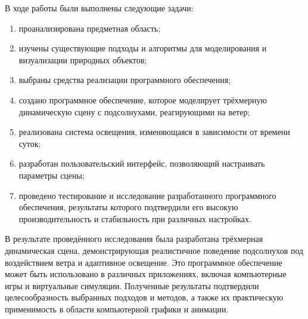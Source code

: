
\vspace{0.5cm}
В ходе работы были выполнены следующие задачи:
\begin{enumerate}
\item проанализирована предметная область;
\item изучены существующие подходы и алгоритмы для моделирования и визуализации природных объектов;
\item выбраны средства реализации программного обеспечения;
\item создано программное обеспечение, которое моделирует трёхмерную динамическую сцену с подсолнухами, реагирующими на ветер;
\item реализована система освещения, изменяющаяся в зависимости от времени суток;
\item разработан пользовательский интерфейс, позволяющий настраивать параметры сцены;
\item проведено тестирование и исследование разработанного программного обеспечения, результаты которого подтвердили его высокую производительность и стабильность при различных настройках.
\end{enumerate}

\vspace{0.5cm}
В результате проведённого исследования была разработана трёхмерная динамическая сцена, демонстрирующая реалистичное поведение подсолнухов под воздействием ветра и адаптивное освещение. Это программное обеспечение может быть использовано в различных приложениях, включая компьютерные игры и виртуальные симуляции. Полученные результаты подтвердили целесообразность выбранных подходов и методов, а также их практическую применимость в области компьютерной графики и анимации.

